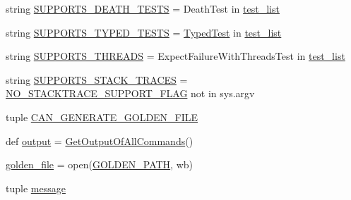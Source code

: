 \begin{DoxyCompactItemize}
string \mbox{\hyperlink{namespacegoogletest_1_1test_1_1googletest-output-test_a165fb716a211e78dec29ad1ebbbc5894}{S\+U\+P\+P\+O\+R\+T\+S\+\_\+\+D\+E\+A\+T\+H\+\_\+\+T\+E\+S\+TS}} = \textquotesingle{}Death\+Test\textquotesingle{} in \mbox{\hyperlink{namespacegoogletest_1_1test_1_1googletest-output-test_a444fd372288937a5fb698098ef061576}{test\+\_\+list}}
\item 
string \mbox{\hyperlink{namespacegoogletest_1_1test_1_1googletest-output-test_a986917046593c87504b43f1cb4e18fc8}{S\+U\+P\+P\+O\+R\+T\+S\+\_\+\+T\+Y\+P\+E\+D\+\_\+\+T\+E\+S\+TS}} = \textquotesingle{}\mbox{\hyperlink{class_typed_test}{Typed\+Test}}\textquotesingle{} in \mbox{\hyperlink{namespacegoogletest_1_1test_1_1googletest-output-test_a444fd372288937a5fb698098ef061576}{test\+\_\+list}}
\item 
string \mbox{\hyperlink{namespacegoogletest_1_1test_1_1googletest-output-test_a56afd7a24670ca774f8619905e73d1b2}{S\+U\+P\+P\+O\+R\+T\+S\+\_\+\+T\+H\+R\+E\+A\+DS}} = \textquotesingle{}Expect\+Failure\+With\+Threads\+Test\textquotesingle{} in \mbox{\hyperlink{namespacegoogletest_1_1test_1_1googletest-output-test_a444fd372288937a5fb698098ef061576}{test\+\_\+list}}
\item 
string \mbox{\hyperlink{namespacegoogletest_1_1test_1_1googletest-output-test_a07d6f9ec7cb3d0bc672ff2e4cbd8eaa2}{S\+U\+P\+P\+O\+R\+T\+S\+\_\+\+S\+T\+A\+C\+K\+\_\+\+T\+R\+A\+C\+ES}} = \mbox{\hyperlink{namespacegoogletest_1_1test_1_1googletest-output-test_a6d6b31f6d4a75dc726bf1d7b21a1b89e}{N\+O\+\_\+\+S\+T\+A\+C\+K\+T\+R\+A\+C\+E\+\_\+\+S\+U\+P\+P\+O\+R\+T\+\_\+\+F\+L\+AG}} not in sys.\+argv
\item 
tuple \mbox{\hyperlink{namespacegoogletest_1_1test_1_1googletest-output-test_a2307b15f49d2957898d6a67e3af65cbf}{C\+A\+N\+\_\+\+G\+E\+N\+E\+R\+A\+T\+E\+\_\+\+G\+O\+L\+D\+E\+N\+\_\+\+F\+I\+LE}}
\item 
def \mbox{\hyperlink{namespacegoogletest_1_1test_1_1googletest-output-test_a6773c2217ae4694b4db5610620562437}{output}} = \mbox{\hyperlink{namespacegoogletest_1_1test_1_1googletest-output-test_a7baabb9ec5690eff9a0985fb468c21da}{Get\+Output\+Of\+All\+Commands}}()
\item 
\mbox{\hyperlink{namespacegoogletest_1_1test_1_1googletest-output-test_a43fd0a2352f415deb258d9b137ac371b}{golden\+\_\+file}} = open(\mbox{\hyperlink{namespacegoogletest_1_1test_1_1googletest-output-test_a8aa8d805d7dfff2638f6faeb8a25cd43}{G\+O\+L\+D\+E\+N\+\_\+\+P\+A\+TH}}, \textquotesingle{}wb\textquotesingle{})
\item 
tuple \mbox{\hyperlink{namespacegoogletest_1_1test_1_1googletest-output-test_a2ccb426013ff32550cc6a34a73cc9eaf}{message}}
\end{DoxyCompactItemize}


